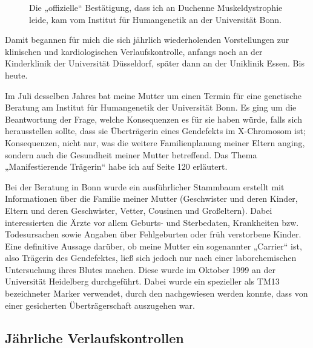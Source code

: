 \documentclass[fontsize=14pt,a4paper,headinclude,DIV=calc,automark]{scrbook}
\begin{document}
\setlength{\fboxsep}{0pt}    %
\setlength{\fboxrule}{0.2pt} %
\begin{figure}[H]
    \centering
    \caption{Die „offizielle“ Bestätigung, dass ich an Duchenne Muskeldystrophie leide, kam vom Institut für Humangenetik an der Universität Bonn.}
    \label{fig:befund_humangenetik}
\end{figure}

Damit begannen für mich die sich jährlich wiederholenden Vorstellungen zur klinischen und kardiologischen Verlaufskontrolle, anfangs noch an der Kinderklinik der Universität Düsseldorf, später dann an der Uniklinik Essen. Bis heute.

Im Juli desselben Jahres bat meine Mutter um einen Termin für eine genetische Beratung am Institut für Humangenetik der Universität Bonn. Es ging um die Beantwortung der Frage, welche Konsequenzen es für sie haben würde, falls sich herausstellen sollte, dass sie Überträgerin eines Gendefekts im X-Chromosom ist; Konsequenzen, nicht nur, was die weitere Familienplanung meiner Eltern anging, sondern auch die Gesundheit meiner Mutter betreffend. Das Thema „Manifestierende Trägerin“ habe ich auf Seite 120 erläutert.

Bei der Beratung in Bonn wurde ein ausführlicher Stammbaum erstellt mit Informationen über die Familie meiner Mutter (Geschwister und deren Kinder, Eltern und deren Geschwister, Vetter, Cousinen und Großeltern). Dabei interessierten die Ärzte vor allem Geburts- und Sterbedaten, Krankheiten bzw. Todesursachen sowie Angaben über Fehlgeburten oder früh verstorbene Kinder.
Eine definitive Aussage darüber, ob meine Mutter ein sogenannter „Carrier“ ist, also Trägerin des Gendefektes, ließ sich jedoch nur nach einer laborchemischen Untersuchung ihres Blutes machen. Diese wurde im Oktober 1999 an der Universität Heidelberg durchgeführt. Dabei wurde ein spezieller als TM13 bezeichneter Marker verwendet, durch den nachgewiesen werden konnte, dass von einer gesicherten Überträgerschaft auszugehen war.

\subsection{Jährliche Verlaufskontrollen}
\end{document}

